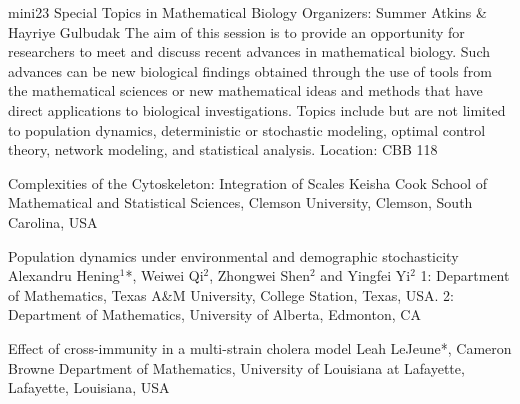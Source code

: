 \mini
{mini23}
{Special Topics in Mathematical Biology}
{Organizers: Summer Atkins \& Hayriye Gulbudak}
{The aim of this session is to provide an opportunity for researchers to meet and discuss recent advances in mathematical biology. Such advances can be new biological findings obtained through the use of tools from the mathematical sciences or  new mathematical ideas and methods that have direct applications to biological investigations. Topics include but are not limited to population dynamics, deterministic or stochastic modeling, optimal control theory, network modeling, and statistical analysis.}
{Location: CBB 118}

\begin{talks}
\item\talk
{Complexities of the Cytoskeleton: Integration of Scales}
{Keisha Cook}
{School of Mathematical and Statistical Sciences, Clemson University, Clemson, South Carolina, USA}
\item\talk
{Population dynamics under environmental and demographic stochasticity}
{Alexandru Hening{$^{1}$*}, Weiwei Qi{$^{2}$}, Zhongwei Shen{$^{2}$} and Yingfei Yi{$^{2}$}}
{1: Department of Mathematics, Texas A\&M University, College Station, Texas, USA. 2: Department of Mathematics,  University of Alberta, Edmonton, CA}
\item\talk
{Effect of cross-immunity in a multi-strain cholera model}
{Leah LeJeune{*}, Cameron Browne}
{Department of Mathematics, University of Louisiana at Lafayette, Lafayette, Louisiana, USA}
\end{talks}
\room
